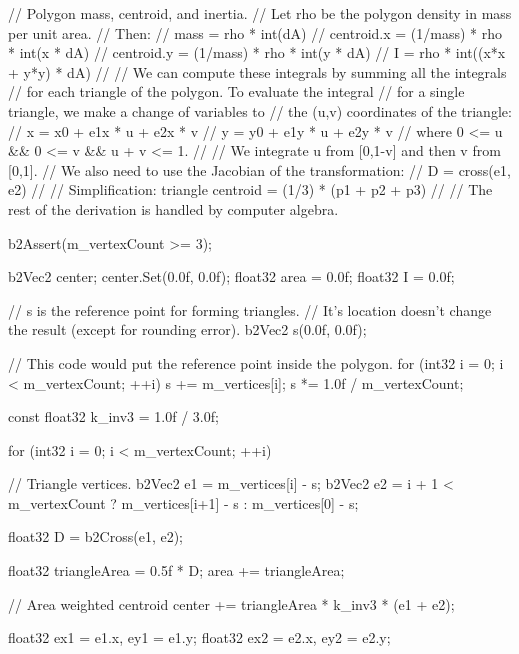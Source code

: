 \begin{DoxyCode}
{
        // Polygon mass, centroid, and inertia.
        // Let rho be the polygon density in mass per unit area.
        // Then:
        // mass = rho * int(dA)
        // centroid.x = (1/mass) * rho * int(x * dA)
        // centroid.y = (1/mass) * rho * int(y * dA)
        // I = rho * int((x*x + y*y) * dA)
        //
        // We can compute these integrals by summing all the integrals
        // for each triangle of the polygon. To evaluate the integral
        // for a single triangle, we make a change of variables to
        // the (u,v) coordinates of the triangle:
        // x = x0 + e1x * u + e2x * v
        // y = y0 + e1y * u + e2y * v
        // where 0 <= u && 0 <= v && u + v <= 1.
        //
        // We integrate u from [0,1-v] and then v from [0,1].
        // We also need to use the Jacobian of the transformation:
        // D = cross(e1, e2)
        //
        // Simplification: triangle centroid = (1/3) * (p1 + p2 + p3)
        //
        // The rest of the derivation is handled by computer algebra.

        b2Assert(m_vertexCount >= 3);

        b2Vec2 center; center.Set(0.0f, 0.0f);
        float32 area = 0.0f;
        float32 I = 0.0f;

        // s is the reference point for forming triangles.
        // It's location doesn't change the result (except for rounding error).
        b2Vec2 s(0.0f, 0.0f);

        // This code would put the reference point inside the polygon.
        for (int32 i = 0; i < m_vertexCount; ++i)
        {
                s += m_vertices[i];
        }
        s *= 1.0f / m_vertexCount;

        const float32 k_inv3 = 1.0f / 3.0f;

        for (int32 i = 0; i < m_vertexCount; ++i)
        {
                // Triangle vertices.
                b2Vec2 e1 = m_vertices[i] - s;
                b2Vec2 e2 = i + 1 < m_vertexCount ? m_vertices[i+1] - s : 
      m_vertices[0] - s;

                float32 D = b2Cross(e1, e2);

                float32 triangleArea = 0.5f * D;
                area += triangleArea;

                // Area weighted centroid
                center += triangleArea * k_inv3 * (e1 + e2);

                float32 ex1 = e1.x, ey1 = e1.y;
                float32 ex2 = e2.x, ey2 = e2.y;

}}
\end{DoxyCode}
